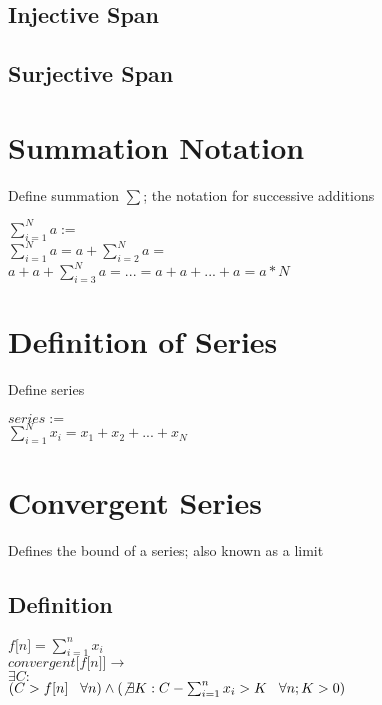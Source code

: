 \documentclass[11pt]{article}
\begin{document}
\subsection{Injective Span}
\subsection{Surjective Span}




\section{Summation Notation}
Define summation $\sum$; the notation for successive additions
\begin{center}
$\sum_{i=1}^{N} a :=$
\\ \vspace{2mm}
$\sum_{i=1}^{N} a = a + \sum_{i=2}^{N} a =$
\\ \vspace{2mm}
$a + a + \sum_{i=3}^{N} a = ... = a + a + ... + a = a * N$
\end{center}




\section{Definition of Series}
Define series
\begin{center}
$series :=$
\\ \vspace{2mm}
$\sum_{i=1}^{N} x_i = x_1 + x_2 + ... + x_N$
\end{center}




\section{Convergent Series}
Defines the bound of a series; also known as a limit\\
\subsection{Definition}
\begin{center}
$ f \lbrack n \rbrack = \sum_{i=1}^{n} x_i$
\\ \vspace{2mm}
$convergent \lbrack f \lbrack n \rbrack \rbrack \rightarrow$
\\ \vspace{2mm}
$\exists C :$
\\ \vspace{2mm}
$ (C >  f[n] \hspace{3mm} \forall n) \land (\not \exists K : C - \sum_{i=1}^{n} x_i > K \hspace{3mm} \forall n; K > 0)$
\end{center}
\end{document}
